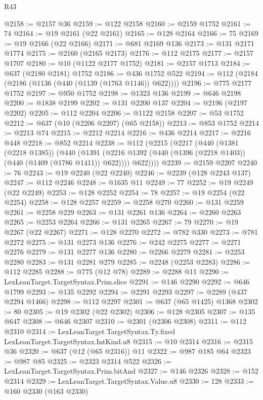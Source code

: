 \begin{lexlean}{R43}
\begin{coremodule}
@2158 := @2157 @36
@2159 := @122 @2158
@2160 := @2159 @1752
@2161 := 74
@2164 := @19 @2161 (@22 @2161)
@2165 := @128 @2164
@2166 := 75
@2169 := @19 @2166 (@22 @2166)
@2171 := @681 @2169 @136
@2173 := @131 @2171 @1774
@2175 := @2160 (@2165 @2173)
@2176 := @112 @2175
@2177 := @2157 @1707
@2180 := @10 (@1122 @2177 @1752)
@2181 := @2157 @1713
@2184 := @637 (@2180 @2181) @1752
@2186 := @436 @1752 @522
@2194 := @112 (@2184 (@2186 (@1136 (@440 (@1139 (@1763 @1146)) @622))))
@2196 := @775 @2177 @1752
@2197 := @950 @1752
@2198 := @1323 @136
@2199 := @646 @2198
@2200 := @1838 @2199
@2202 := @131 @2200 @137
@2204 := @2196 (@2197 @2202)
@2205 := @112 @2204
@2206 := @1122 @2158
@2207 := @53 @1752
@2212 := @637 (@10 (@2206 @2207) (@65 @2158))
@2213 := @853 @1752
@2214 := @2213 @74
@2215 := @2212 @2214
@2216 := @436 @2214
@2217 := @2216 @448
@2218 := @852 @2214
@2238 := @112
    (@2215
      (@2217
        (@440
          (@1381 (@2218 @1385))
          (@440
            (@1391 (@2216 @1392 (@440 (@1396 (@2218 @1403)) (@440 (@1409 (@1786 @1411)) @622))))
            @622))))
@2239 := @2159 @2207
@2240 := 76
@2243 := @19 @2240 (@22 @2240)
@2246 := @2239 (@128 @2243 @137)
@2247 := @112 @2246
@2248 := @1635 @11
@2249 := 77
@2252 := @19 @2249 (@22 @2249)
@2253 := @128 @2252
@2254 := 78
@2257 := @19 @2254 (@22 @2254)
@2258 := @128 @2257
@2259 := @2258 @270
@2260 := @131 @2259
@2261 := @2258 @229
@2263 := @131 @2261 @136
@2264 := @2260 @2263
@2265 := @2253 @2264
@2266 := @131 @2265
@2267 := 79
@2270 := @19 @2267 (@22 @2267)
@2271 := @128 @2270
@2272 := @782 @330
@2273 := @781 @2272
@2275 := @131 @2273 @136
@2276 := @242 @2275
@2277 := @2271 @2276
@2279 := @131 @2277 @136
@2280 := @2266 @2279
@2281 := @2253 @2280
@2283 := @131 @2281 @279
@2285 := @2248 (@2253 @2283)
@2286 := @112 @2285
@2288 := @775 (@12 @78)
@2289 := @2288 @11
@2290 := LexLeanTarget.TargetSyntax.Prim.slice
@2291 := @146 @2290
@2292 := @646 @1799
@2293 := @135 @2292
@2294 := @2291 @2293
@2297 := @2289 (@437 @2294 @1466)
@2298 := @112 @2297
@2301 := @637 (@65 @1425) @1368
@2302 := 80
@2305 := @19 @2302 (@22 @2302)
@2306 := @128 @2305
@2307 := @135 @647
@2308 := @646 @2307
@2310 := @2301 (@2306 @2308)
@2311 := @112 @2310
@2314 := LexLeanTarget.TargetSyntax.Ty.fixed LexLeanTarget.TargetSyntax.IntKind.u8
@2315 := @10 @2314
@2316 := @2315 @36
@2320 := @637 (@12 (@65 @2316)) @11
@2322 := @987 @185 @64
@2323 := @987 @85
@2325 := @2323 @2314 @522
@2326 := LexLeanTarget.TargetSyntax.Prim.bitAnd
@2327 := @146 @2326
@2328 := @152 @2314
@2329 := LexLeanTarget.TargetSyntax.Value.u8
@2330 := 128
@2333 := @160 @2330 (@163 @2330)

\end{coremodule}
\end{lexlean}
